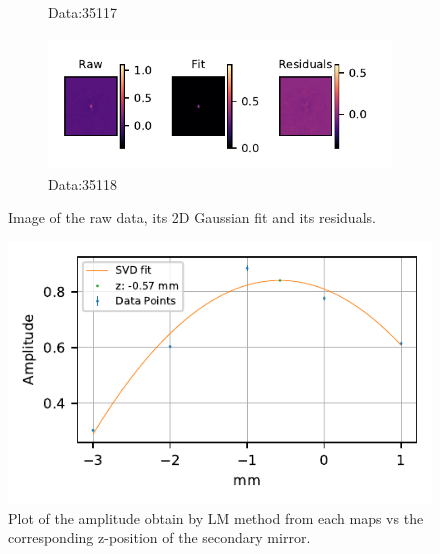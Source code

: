 \begin{figure}
\begin{subfigure}[b]{.49\textwidth}
        \caption{Data:35117}
        \label{fig:lmtFit7}
    \end{subfigure}
    \begin{subfigure}[b]{.49\textwidth}
        \centering
        \includegraphics[height=100pt]{CodeAndFigures/DataFits8.pdf}
        \caption{Data:35118}
        \label{fig:lmtFit8}
    \end{subfigure}
    \caption{Image of the raw data, its 2D Gaussian fit and its residuals.}
    \label{fig:lmtRaw}
\end{figure}


\begin{figure}
    \centering
    \includegraphics{CodeAndFigures/QuadFitPlot.pdf}
    \caption{Plot of the amplitude obtain by LM method from each maps vs the corresponding z-position of the secondary mirror. }
    \label{fig:lmtquadfit}
\end{figure}

\subsection{}


